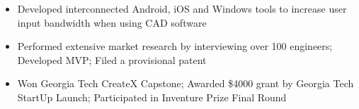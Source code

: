 \documentclass[10pt,letter,ragged2e,withhyper]{altacv}
\begin{document}
\begin{paracol}{2}

\begin{itemize}
\item Developed interconnected Android, iOS and Windows tools to increase user input bandwidth when using CAD software
\item Performed extensive market research by interviewing over 100 engineers; Developed MVP; Filed a provisional patent
\item Won Georgia Tech CreateX Capstone; Awarded \$4000 grant by Georgia Tech StartUp Launch; Participated in Inventure Prize Final Round
\end{itemize}

\switchcolumn


















\end{paracol}
\end{document}
